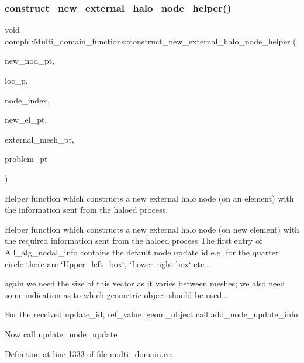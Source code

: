 \subsubsection{\texorpdfstring{construct\+\_\+new\+\_\+external\+\_\+halo\+\_\+node\+\_\+helper()}{construct\_new\_external\_halo\_node\_helper()}}
{\footnotesize\ttfamily void oomph\+::\+Multi\+\_\+domain\+\_\+functions\+::construct\+\_\+new\+\_\+external\+\_\+halo\+\_\+node\+\_\+helper (\begin{DoxyParamCaption}\item[{\hyperlink{classoomph_1_1Node}{Node} $\ast$\&}]{new\+\_\+nod\+\_\+pt,  }\item[{unsigned \&}]{loc\+\_\+p,  }\item[{unsigned \&}]{node\+\_\+index,  }\item[{\hyperlink{classoomph_1_1FiniteElement}{Finite\+Element} $\ast$const \&}]{new\+\_\+el\+\_\+pt,  }\item[{\hyperlink{classoomph_1_1Mesh}{Mesh} $\ast$const \&}]{external\+\_\+mesh\+\_\+pt,  }\item[{\hyperlink{classoomph_1_1Problem}{Problem} $\ast$}]{problem\+\_\+pt }\end{DoxyParamCaption})}



Helper function which constructs a new external halo node (on an element) with the information sent from the haloed process. 

Helper function which constructs a new external halo node (on new element) with the required information sent from the haloed process The first entry of All\+\_\+alg\+\_\+nodal\+\_\+info contains the default node update id e.\+g. for the quarter circle there are \char`\"{}\+Upper\+\_\+left\+\_\+box\char`\"{}, \char`\"{}\+Lower right box\char`\"{} etc...

again we need the size of this vector as it varies between meshes; we also need some indication as to which geometric object should be used...

For the received update\+\_\+id, ref\+\_\+value, geom\+\_\+object call add\+\_\+node\+\_\+update\+\_\+info

Now call update\+\_\+node\+\_\+update 

Definition at line 1333 of file multi\+\_\+domain.\+cc.



